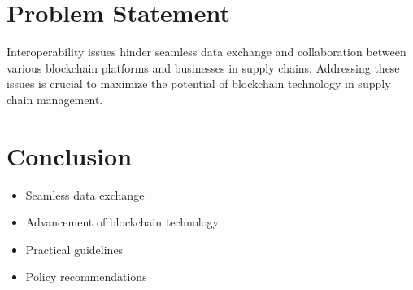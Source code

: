 \documentclass{beamer}
\begin{document}
\section{Problem Statement}
\begin{frame}

\vspace{0.5cm}
Interoperability issues hinder seamless data exchange and collaboration between various blockchain platforms and businesses in supply chains. Addressing these issues is crucial to maximize the potential of blockchain technology in supply chain management.
\end{frame}

\section{Conclusion}
\begin{frame}

\vspace{0.5cm}
\begin{itemize}
    \item Seamless data exchange
    \item Advancement of blockchain technology
    \item Practical guidelines
    \item Policy recommendations
\end{itemize}
\end{frame}
\end{document}
